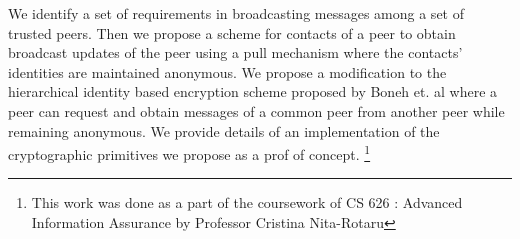 We identify a set of requirements in broadcasting messages among a set of trusted peers. Then we propose a scheme for contacts of a peer to obtain broadcast updates of the peer using a pull mechanism where the contacts' identities are maintained anonymous. 
We propose a modification to the hierarchical identity based encryption scheme proposed by Boneh et. al \cite{BBG05} where a peer can request and obtain messages of a common peer from another peer while remaining anonymous. We provide details of an implementation of the cryptographic primitives we propose as a prof of concept. \footnote {This work was done as a part of the coursework of CS 626 : Advanced Information Assurance by Professor Cristina Nita-Rotaru}
